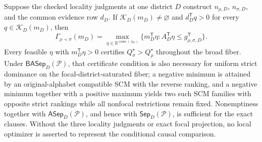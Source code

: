 Suppose the checked locality judgments at one district \(D\) construct \(n_{\rho,D}\), \(n_{\sigma,D}\), and the common evidence row \(d_D\).  If \(\mathcal K_D(m_D)\ne\varnothing\) and \(d_D^{\mathsf T}q>0\) for every \(q\in\mathcal K_D(m_D)\), then
\[
\Gamma_{\rho\prec\sigma}(m_D)=
\max_{\eta\in\mathbb R^{\operatorname{rows}(A_D)}}
\{m_D^{\mathsf T}\eta:A_D^{\mathsf T}\eta\le g_{\rho,\sigma,D}^{\mathsf T}\}.
\]
Every feasible \(\eta\) with \(m_D^{\mathsf T}\eta>0\) certifies \(Q_\sigma^\star>Q_\rho^\star\) throughout the broad fiber.  Under \(\mathsf{BASep}_D(\mathcal P)\), that certificate condition is also necessary for uniform strict dominance on the focal-district-saturated fiber; a negative minimum is attained by an original-alphabet compatible SCM with the reverse ranking, and a negative minimum together with a positive maximum yields two such SCM families with opposite strict rankings while all nonfocal restrictions remain fixed.  Nonemptiness together with \(\mathsf{ASep}_D(\mathcal P)\), and hence with \(\mathsf{Sep}_D(\mathcal P)\), is sufficient for the exact clauses.  Without the three locality judgments or exact focal projection, no local optimizer is asserted to represent the conditional causal comparison.